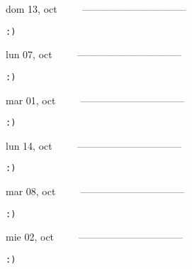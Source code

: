 \documentclass[letterpaper,10pt]{article}
\begin{document}
\begin{multicols}{3}
{dom 13, oct\ \ \ \ \ --------------------------------}
\begin{flushright}\begin{small}\texttt{:)}\end{small}\end{flushright}
\vfill
{lun 07, oct\ \ \ \ \ --------------------------------}
\begin{flushright}\begin{small}\texttt{:)}\end{small}\end{flushright}\par
\vfill
{mar 01, oct\ \ \ \ \ --------------------------------}
\begin{flushright}\begin{small}\texttt{:)}\end{small}\end{flushright}\par
\vfill
\end{multicols}
\vspace{1.05cm}

\begin{multicols}{3}
{lun 14, oct\ \ \ \ \ --------------------------------}
\begin{flushright}\begin{small}\texttt{:)}\end{small}\end{flushright}
\vfill
{mar 08, oct\ \ \ \ \ --------------------------------}
\begin{flushright}\begin{small}\texttt{:)}\end{small}\end{flushright}\par
\vfill
{mie 02, oct\ \ \ \ \ --------------------------------}
\begin{flushright}\begin{small}\texttt{:)}\end{small}\end{flushright}\par
\vfill
\end{multicols}
\vspace{1.05cm}
\end{document}
